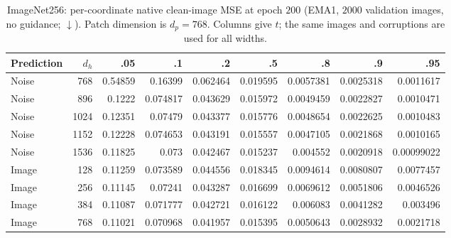 \begin{table}[H]
\centering
\caption{ImageNet256: per-coordinate native clean-image MSE at epoch $200$ (EMA1, $2000$ validation images, no guidance; $\downarrow$). Patch dimension is $d_p=768$. Columns give $t$; the same images and corruptions are used for all widths.}
\label{tab:width-loss-grid-256}
\small
\setlength{\tabcolsep}{3pt}
\begin{tabular}{lrrrrrrrr}
\toprule
Prediction & $d_h$ & .05 & .1 & .2 & .5 & .8 & .9 & .95\\
\midrule
Noise & 768 & 0.54859 & 0.16399 & 0.062464 & 0.019595 & 0.0057381 & 0.0025318 & 0.0011617\\
Noise & 896 & 0.1222 & 0.074817 & 0.043629 & 0.015972 & 0.0049459 & 0.0022827 & 0.0010471\\
Noise & 1024 & 0.12351 & 0.07479 & 0.043377 & 0.015776 & 0.0048654 & 0.0022625 & 0.0010483\\
Noise & 1152 & 0.12228 & 0.074653 & 0.043191 & 0.015557 & 0.0047105 & 0.0021868 & 0.0010165\\
Noise & 1536 & 0.11825 & 0.073 & 0.042467 & 0.015237 & 0.004552 & 0.0020918 & 0.00099022\\
Image & 128 & 0.11259 & 0.073589 & 0.044556 & 0.018345 & 0.0094614 & 0.0080807 & 0.0077457\\
Image & 256 & 0.11145 & 0.07241 & 0.043287 & 0.016699 & 0.0069612 & 0.0051806 & 0.0046526\\
Image & 384 & 0.11087 & 0.071777 & 0.042721 & 0.016122 & 0.006083 & 0.0041282 & 0.003496\\
Image & 768 & 0.11021 & 0.070968 & 0.041957 & 0.015395 & 0.0050643 & 0.0028932 & 0.0021718\\
\bottomrule
\end{tabular}
\end{table}
